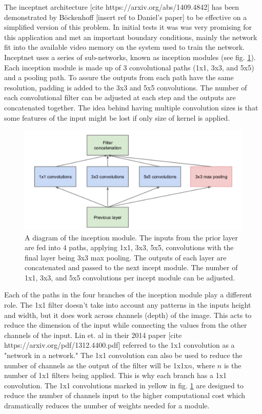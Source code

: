 \label{sec:code:inceptnet}

The inceptnet architecture [cite https://arxiv.org/abs/1409.4842] has been demonstrated by Böckenhoff [insert ref to Daniel's paper] to be effective on a simplified version of this problem.
In initial tests it was was very promising for this application and met an important boundary conditions, mainly the network fit into the available video memory on the system used to train the network.
Inceptnet uses a series of sub-networks, known as inception modules (see fig. \ref{fig:code:inceptmodule}).
Each inception module is made up of 3 convolutional paths (1x1, 3x3, and 5x5) and a pooling path.
To assure the outputs from each path have the same resolution, padding is added to the 3x3 and 5x5 convolutions.
The number of each convolutional filter can be adjusted at each step and the outputs are concatenated together.
The idea behind having multiple convolution sizes is that some features of the input might be lost if only size of kernel is applied.

\begin{figure}[htb]
    \includegraphics[width=\textwidth]{images/incept-simple.png}
    \caption{A diagram of the inception module. The inputs from the prior layer are fed into 4 paths, applying 1x1, 3x3, 5x5, convolutions with the final layer being 3x3 max pooling. The outputs of each layer are concatenated and passed to the next incept module. The number of 1x1, 3x3, and 5x5 convolutions per incept module can be adjusted.}
    \label{fig:code:inceptmodule}
\end{figure}

Each of the paths in the four branches of the inception module play a different role.
The 1x1 filter doesn't take into account any patterns in the inputs height and width, but it does work across channels (depth) of the image.
This acts to reduce the dimension of the input while connecting the values from the other channels of the input.
Lin et. al in their 2014 paper [cite https://arxiv.org/pdf/1312.4400.pdf] referred to the 1x1 convolution as a "network in a network."
The 1x1 convolution can also be used to reduce the number of channels as the output of the filter will be 1x1x$n$, where $n$ is the number of 1x1 filters being applied.
This is why each branch has a 1x1 convolution.
The 1x1 convolutions marked in yellow in fig. \ref{fig:code:inceptmodule} are designed to reduce the number of channels input to the higher computational cost which dramatically reduces the number of weights needed for a module.

